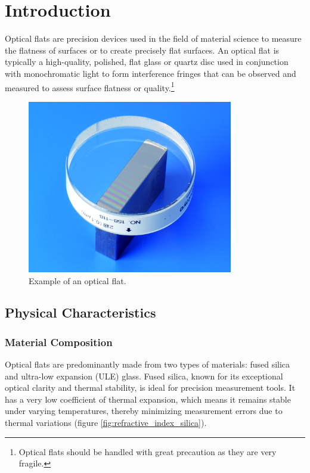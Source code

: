 \documentclass[../main.tex]{subfiles}
\begin{document}
\chapter{Introduction}
Optical flats are precision devices used in the field of material science to measure the flatness of surfaces or to create precisely flat surfaces. An optical flat is typically a high-quality, polished, flat glass or quartz disc used in conjunction with monochromatic light to form interference fringes that can be observed and measured to assess surface flatness or quality.\footnote{Optical flats should be handled with great precaution as they are very fragile.} \cite{Toru_2017, edmund_optics_optical_flats, kemet_optical_flats, lapmaster_wolters_optical_flats,Paschottaoptical_flats}

\begin{frame}{}
    \begin{figure}[h]
        \centering
        \includegraphics[width=0.8\textwidth]{Images/Introduction/optical_flat}
        \caption{Example of an optical flat.\cite{optical_flat_mitutoyo}}
        \label{fig:optical_flat_example}
    \end{figure}
\end{frame}

\section{Physical Characteristics}
\subsection{Material Composition}
Optical flats are predominantly made from two types of materials: fused silica and ultra-low expansion (ULE) glass. Fused silica, known for its exceptional optical clarity and thermal stability, is ideal for precision measurement tools. It has a very low coefficient of thermal expansion, which means it remains stable under varying temperatures, thereby minimizing measurement errors due to thermal variations (figure \ref{fig:refractive_index_silica}).\cite{Paschottafused_silica}
\end{document}
